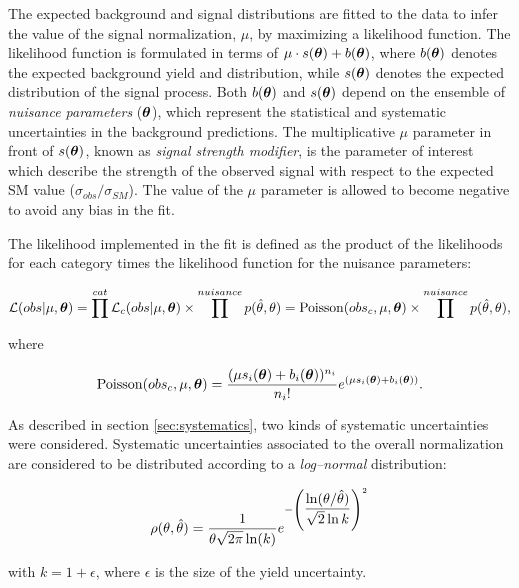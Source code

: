 {\color{red}
The expected background and signal distributions are fitted to the data to infer the value of the signal normalization, $\mu$, by maximizing a likelihood function.
The likelihood function is formulated in terms of $\mu \cdot s(\boldsymbol\theta) + b(\boldsymbol\theta)$, where $b(\boldsymbol\theta)$ denotes the expected background yield and distribution, while $s(\boldsymbol\theta)$ denotes the expected distribution of the signal process. Both $b(\boldsymbol\theta)$ and $s(\boldsymbol\theta)$ depend on the ensemble of \emph{nuisance parameters} ($\boldsymbol\theta$), which represent the statistical and systematic uncertainties in the background predictions. The multiplicative $\mu$ parameter in front of $s(\boldsymbol\theta)$, known as \emph{signal strength modifier}, is the parameter of interest which describe the strength of the observed signal with respect to the expected SM value ($\sigma_{obs}/\sigma_{SM}$). The value of the $\mu$ parameter is allowed to become negative to avoid any bias in the fit.

The likelihood implemented in the fit is defined as the product of the likelihoods for each category times the likelihood function for the nuisance parameters:
}
\begin{equation}
\mathcal{L}(obs|\mu, \boldsymbol\theta) = \prod^{cat} \mathcal{L}_c(obs|\mu, \boldsymbol\theta) \times \prod^{nuisance} p(\hat{\theta},\theta) = \operatorname{Poisson}(obs_c, \mu, \boldsymbol\theta) \times \prod^{nuisance} p(\hat{\theta},\theta),
\end{equation}

where

\begin{equation}
\operatorname{Poisson}(obs_c, \mu, \boldsymbol\theta) = \dfrac{(\mu s_i(\boldsymbol\theta) + b_i(\boldsymbol\theta))^{n_i}}{n_i!}e^{(\mu s_i(\boldsymbol\theta) + b_i(\boldsymbol\theta))}.
\end{equation}

As described in section \ref{sec:systematics}, two kinds of systematic uncertainties were considered. Systematic uncertainties associated to the overall normalization are considered to be distributed according to a \emph{log--normal} distribution:

\begin{equation}
\rho(\theta, \hat{\theta}) = \dfrac{1}{\theta\sqrt{2\pi}\operatorname{ln}(k)} e^{-\left(\dfrac{\operatorname{ln}(\theta/\hat{\theta})}{\sqrt{2}\operatorname{ln}k}\right)^2}
\end{equation}

with $k = 1+ \epsilon$, where $\epsilon$ is the size of the yield uncertainty.

